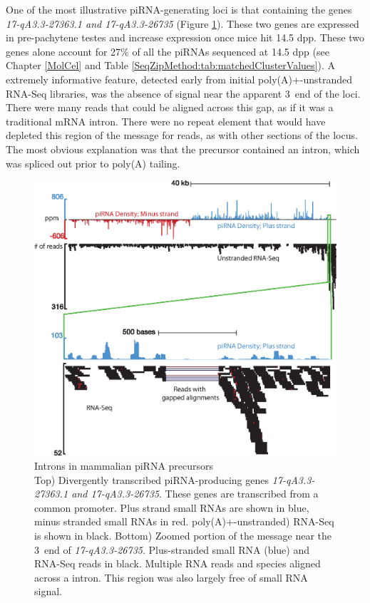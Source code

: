   One of the most illustrative piRNA-generating loci is that containing the genes \textit{17-qA3.3-27363.1 and 17-qA3.3-26735} (Figure \ref{SeqZipMethod:fig:no piRNAs within Precursor Introns}). These two genes are expressed in pre-pachytene testes and increase expression once mice hit 14.5 dpp. These two genes alone account for 27\% of all the piRNAs sequenced at 14.5 dpp (see Chapter \ref{MolCel} and Table \ref{SeqZipMethod:tab:matchedClusterValues}). A extremely informative feature, detected early from initial poly(A)+-unstranded RNA-Seq libraries, was the absence of signal near the apparent 3\textprime~end of the loci. There were many reads that could be aligned across this gap, as if it was a traditional mRNA intron. There were no repeat element that would have depleted this region of the message for reads, as with other sections of the locus. The most obvious explanation was that the precursor contained an intron, which was spliced out prior to poly(A) tailing.

  \begin{figure} %
    \centering 
    \includegraphics{Figures/SeqZipMethod/noPiRNAswithinPrecusorIntrons.eps}
    \caption[Introns in mammalian piRNA precursors]
    {
      Introns in mammalian piRNA precursors\\[0.25cm]
      Top) Divergently transcribed piRNA-producing genes \textit{17-qA3.3-27363.1 and 17-qA3.3-26735}. These genes are transcribed from a common promoter. Plus strand small RNAs are shown in blue, minus stranded small RNAs in red. poly(A)+-unstranded) RNA-Seq is shown in black. Bottom) Zoomed portion of the message near the 3\textprime~end of \textit{17-qA3.3-26735}. Plus-stranded small RNA (blue) and RNA-Seq reads in black. Multiple RNA reads and species aligned across a intron. This region was also largely free of small RNA signal.
      }
    \label{SeqZipMethod:fig:no piRNAs within Precursor Introns}
    \end{figure}

